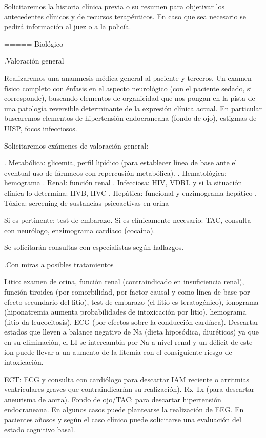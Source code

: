 \documentclass[encares.tex]{subfiles}
\begin{document}
Solicitaremos la historia clínica previa o su resumen para objetivar los antecedentes clínicos y de recursos terapéuticos. En caso que sea necesario se pedirá información al juez o a la policía.

===== Biológico

.Valoración general

Realizaremos una anamnesis médica general al paciente y terceros. Un examen físico completo con énfasis en el aspecto neurológico (con el paciente sedado, si corresponde), buscando elementos de organicidad que nos pongan en la pista de una patología reversible determinante de la expresión clínica actual. En particular buscaremos elementos de hipertensión endocraneana (fondo de ojo), estigmas de UISP, focos infecciosos.

Solicitaremos exámenes de valoración general:

. Metabólica: glicemia, perfil lipídico (para establecer línea de base ante el eventual uso de fármacos con repercusión metabólica).
. Hematológica: hemograma
. Renal: función renal
. Infecciosa: HIV, VDRL y si la situación clínica lo determina: HVB, HVC
. Hepática: funcional y enzimograma hepático
. Tóxica: screening de sustancias psicoactivas en orina

Si es pertinente: test de embarazo.
Si es clínicamente necesario: TAC, consulta con neurólogo, enzimograma cardíaco (cocaína).

Se solicitarán consultas con especialistas según hallazgos.

.Con miras a posibles tratamientos

Litio: examen de orina, función renal (contraindicado en insuficiencia renal), función tiroidea (por comorbilidad, por factor causal y como línea de base por efecto secundario del litio), test de embarazo (el litio es teratogénico), ionograma (hiponatremia aumenta probabilidades de intoxicación por litio), hemograma (litio da leucocitosis), ECG (por efectos sobre la conducción cardíaca). Descartar estados que lleven a balance negativo de Na (dieta hiposódica, diuréticos) ya que en su eliminación, el LI se intercambia por Na a nivel renal y un déficit de este ion puede llevar a un aumento de la litemia con el consiguiente riesgo de intoxicación.

ECT: ECG y consulta con cardiólogo para descartar IAM reciente o arritmias ventriculares graves que contraindicarían su realización). Rx Tx (para descartar aneurisma de aorta). Fondo de ojo/TAC: para descartar hipertensión endocraneana. En algunos casos puede plantearse la realización de EEG. En pacientes añosos y según el caso clínico puede solicitarse una evaluación del estado cognitivo basal.
\end{document}
